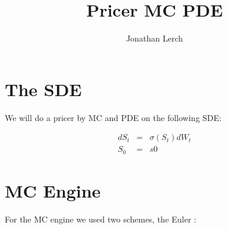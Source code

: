 \documentclass[11pt,twoside,a4paper]{article}
\begin{document}
\pagestyle{empty} %



\title{Pricer MC PDE}
\author{Jonathan Lerch}
\maketitle




\pagestyle{plain} %








\section{The SDE}\label{umlauts}
We will do a pricer by MC and PDE on the following SDE:

\begin{eqnarray*}
  dS_t & = & \sigma(S_t) dW_t\\
	S_0  &= & s0
\end{eqnarray*}


\section{MC Engine}

For the MC engine we used two schemes, the Euler :
\end{document}
